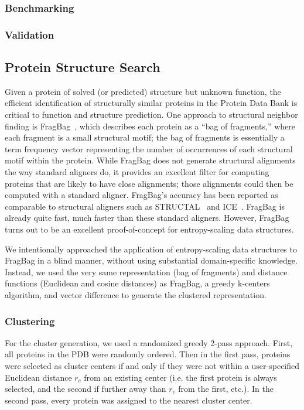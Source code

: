 \documentclass[review,preprint,12pt]{elsarticle}
\renewcommand{\cite}{\citep} %
\theoremstyle{definition}
\theoremstyle{remark}
\numberwithin{equation}{section}
\begin{document}
\subsubsection{Benchmarking}



\subsubsection{Validation}

\subsection{Protein Structure Search}

Given a protein of solved (or predicted) structure but unknown function, the efficient identification
of structurally similar proteins in the Protein Data Bank is critical to function and structure prediction.
One approach to structural neighbor finding is FragBag~\cite{budowski2010fragbag}, which describes each protein as a
``bag of fragments,'' where each fragment is a small structural motif; the bag of fragments is essentially
a term frequency vector representing the number of occurrences of each structural motif within the protein.
While FragBag does not generate structural alignments the way standard aligners do, it provides an excellent
filter for computing proteins that are likely to have close alignments; those alignments could then be computed
with a standard aligner.
FragBag's accuracy has been reported as comparable to structural aligners such as STRUCTAL~\cite{blah} and
ICE~\cite{blah}.
FragBag is already quite fast, much faster than these standard aligners.
However, FragBag turns out to be an excellent proof-of-concept for entropy-scaling data structures.

We intentionally approached the application of entropy-scaling data structures to FragBag in a blind manner,
without using substantial domain-specific knowledge.
Instead, we used the very same representation (bag of fragments) and distance functions (Euclidean and cosine distances)
as FragBag, a greedy k-centers algorithm, and vector difference to generate the clustered representation.

\subsubsection{Clustering}
For the cluster generation, we used a randomized greedy 2-pass approach.
First, all proteins in the PDB were randomly ordered.
Then in the first pass, proteins were selected as cluster centers if and only if they were not within a user-specified Euclidean distance $r_c$ from an existing center (i.e. the first protein is always selected, and the second if further away than $r_c$ from the first, etc.).
In the second pass, every protein was assigned to the nearest cluster center.
\end{document}
